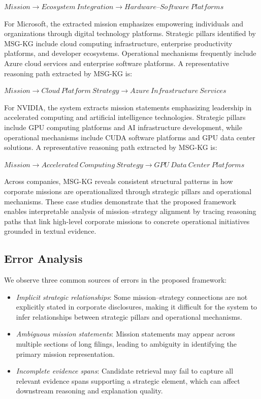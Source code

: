 \documentclass[11pt]{article}
\begin{document}
$Mission \rightarrow Ecosystem\ Integration \rightarrow Hardware$--$Software\ Platforms$

For Microsoft, the extracted mission emphasizes empowering individuals and organizations through digital technology platforms. Strategic pillars identified by MSG-KG include cloud computing infrastructure, enterprise productivity platforms, and developer ecosystems. Operational mechanisms frequently include Azure cloud services and enterprise software platforms. 
A representative reasoning path extracted by MSG-KG is:

$Mission \rightarrow Cloud\ Platform\ Strategy \rightarrow Azure\ Infrastructure\ Services$

For NVIDIA, the system extracts mission statements emphasizing leadership in accelerated computing and artificial intelligence technologies. Strategic pillars include GPU computing platforms and AI infrastructure development, while operational mechanisms include CUDA software platforms and GPU data center solutions. A representative reasoning path extracted by MSG-KG is:

$Mission \rightarrow Accelerated\ Computing\ Strategy \rightarrow GPU\ Data\ Center\ Platforms$

Across companies, MSG-KG reveals consistent structural patterns in how corporate missions are operationalized through strategic pillars and operational mechanisms. These case studies demonstrate that the proposed framework enables interpretable analysis of mission–strategy alignment by tracing reasoning paths that link high-level corporate missions to concrete operational initiatives grounded in textual evidence.


\subsection{Error Analysis}

We observe three common sources of errors in the proposed framework:

\begin{itemize}[leftmargin=1em, itemsep=0pt, topsep=2pt]
\item \textit{Implicit strategic relationships}: Some mission–strategy connections are not explicitly stated in corporate disclosures, making it difficult for the system to infer relationships between strategic pillars and operational mechanisms.

\item \textit{Ambiguous mission statements}: Mission statements may appear across multiple sections of long filings, leading to ambiguity in identifying the primary mission representation.

\item \textit{Incomplete evidence spans}: Candidate retrieval may fail to capture all relevant evidence spans supporting a strategic element, which can affect downstream reasoning and explanation quality.
\end{itemize}
\end{document}
